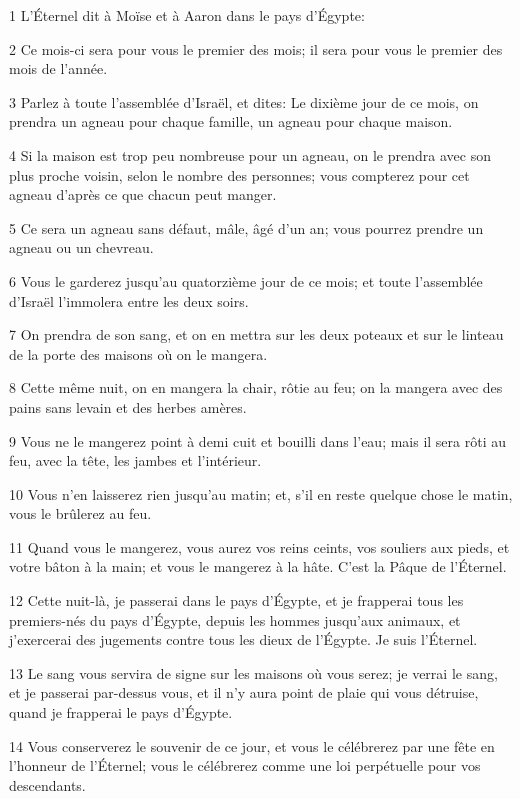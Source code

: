 \par 1 L'Éternel dit à Moïse et à Aaron dans le pays d'Égypte:
\par 2 Ce mois-ci sera pour vous le premier des mois; il sera pour vous le premier des mois de l'année.
\par 3 Parlez à toute l'assemblée d'Israël, et dites: Le dixième jour de ce mois, on prendra un agneau pour chaque famille, un agneau pour chaque maison.
\par 4 Si la maison est trop peu nombreuse pour un agneau, on le prendra avec son plus proche voisin, selon le nombre des personnes; vous compterez pour cet agneau d'après ce que chacun peut manger.
\par 5 Ce sera un agneau sans défaut, mâle, âgé d'un an; vous pourrez prendre un agneau ou un chevreau.
\par 6 Vous le garderez jusqu'au quatorzième jour de ce mois; et toute l'assemblée d'Israël l'immolera entre les deux soirs.
\par 7 On prendra de son sang, et on en mettra sur les deux poteaux et sur le linteau de la porte des maisons où on le mangera.
\par 8 Cette même nuit, on en mangera la chair, rôtie au feu; on la mangera avec des pains sans levain et des herbes amères.
\par 9 Vous ne le mangerez point à demi cuit et bouilli dans l'eau; mais il sera rôti au feu, avec la tête, les jambes et l'intérieur.
\par 10 Vous n'en laisserez rien jusqu'au matin; et, s'il en reste quelque chose le matin, vous le brûlerez au feu.
\par 11 Quand vous le mangerez, vous aurez vos reins ceints, vos souliers aux pieds, et votre bâton à la main; et vous le mangerez à la hâte. C'est la Pâque de l'Éternel.
\par 12 Cette nuit-là, je passerai dans le pays d'Égypte, et je frapperai tous les premiers-nés du pays d'Égypte, depuis les hommes jusqu'aux animaux, et j'exercerai des jugements contre tous les dieux de l'Égypte. Je suis l'Éternel.
\par 13 Le sang vous servira de signe sur les maisons où vous serez; je verrai le sang, et je passerai par-dessus vous, et il n'y aura point de plaie qui vous détruise, quand je frapperai le pays d'Égypte.
\par 14 Vous conserverez le souvenir de ce jour, et vous le célébrerez par une fête en l'honneur de l'Éternel; vous le célébrerez comme une loi perpétuelle pour vos descendants.
